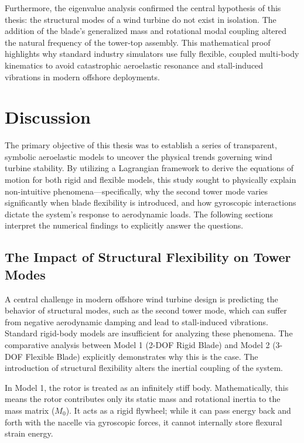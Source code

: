\documentclass[final,onecolumn]{IEEEtran}
\begin{document}
Furthermore, the eigenvalue analysis confirmed the central hypothesis of this thesis: the structural modes of a wind turbine do not exist in isolation. The addition of the blade's generalized mass and rotational modal coupling altered the natural frequency of the tower-top assembly. This mathematical proof highlights why standard industry simulators use fully flexible, coupled multi-body kinematics to avoid catastrophic aeroelastic resonance and stall-induced vibrations in modern offshore deployments.

\section{Discussion} \label{sec:discussion}
The primary objective of this thesis was to establish a series of transparent, symbolic aeroelastic models to uncover the physical trends governing wind turbine stability. By utilizing a Lagrangian framework to derive the equations of motion for both rigid and flexible models, this study sought to physically explain non-intuitive phenomena—specifically, why the second tower mode varies significantly when blade flexibility is introduced, and how gyroscopic interactions dictate the system's response to aerodynamic loads. The following sections interpret the numerical findings to explicitly answer the questions.

\subsection{The Impact of Structural Flexibility on Tower Modes}
\label{sec:discussion_flexibility}

A central challenge in modern offshore wind turbine design is predicting the behavior of structural modes, such as the second tower mode, which can suffer from negative aerodynamic damping and lead to stall-induced vibrations. Standard rigid-body models are insufficient for analyzing these phenomena. The comparative analysis between Model 1 (2-DOF Rigid Blade) and Model 2 (3-DOF Flexible Blade) explicitly demonstrates why this is the case. The introduction of structural flexibility alters the inertial coupling of the system.

In Model 1, the rotor is treated as an infinitely stiff body. Mathematically, this means the rotor contributes only its static mass and rotational inertia to the mass matrix ($M_0$). It acts as a rigid flywheel; while it can pass energy back and forth with the nacelle via gyroscopic forces, it cannot internally store flexural strain energy.
\end{document}
